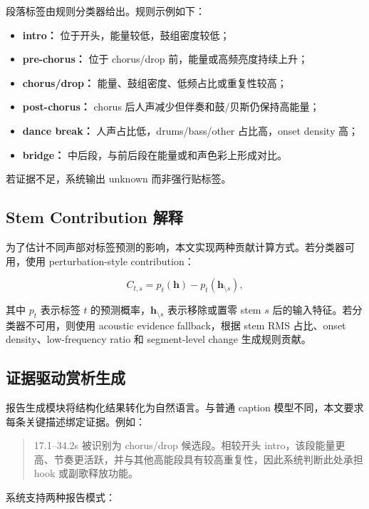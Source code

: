 \documentclass[UTF8,zihao=-4]{ctexart}
\begin{document}
段落标签由规则分类器给出。规则示例如下：

\begin{itemize}[leftmargin=2em]
    \item \textbf{intro：} 位于开头，能量较低，鼓组密度较低；
    \item \textbf{pre-chorus：} 位于 chorus/drop 前，能量或高频亮度持续上升；
    \item \textbf{chorus/drop：} 能量、鼓组密度、低频占比或重复性较高；
    \item \textbf{post-chorus：} chorus 后人声减少但伴奏和鼓/贝斯仍保持高能量；
    \item \textbf{dance break：} 人声占比低，drums/bass/other 占比高，onset density 高；
    \item \textbf{bridge：} 中后段，与前后段在能量或和声色彩上形成对比。
\end{itemize}

若证据不足，系统输出 unknown 而非强行贴标签。

\subsection{Stem Contribution 解释}

为了估计不同声部对标签预测的影响，本文实现两种贡献计算方式。若分类器可用，使用 perturbation-style contribution：

\begin{equation}
C_{t,s}=p_t(\bm{h})-p_t(\bm{h}_{\setminus s}),
\end{equation}

其中 $p_t$ 表示标签 $t$ 的预测概率，$\bm{h}_{\setminus s}$ 表示移除或置零 stem $s$ 后的输入特征。若分类器不可用，则使用 acoustic evidence fallback，根据 stem RMS 占比、onset density、low-frequency ratio 和 segment-level change 生成规则贡献。

\subsection{证据驱动赏析生成}

报告生成模块将结构化结果转化为自然语言。与普通 caption 模型不同，本文要求每条关键描述绑定证据。例如：

\begin{quote}
17.1--34.2s 被识别为 chorus/drop 候选段。相较开头 intro，该段能量更高、节奏更活跃，并与其他高能段具有较高重复性，因此系统判断此处承担 hook 或副歌释放功能。
\end{quote}

系统支持两种报告模式：
\end{document}
